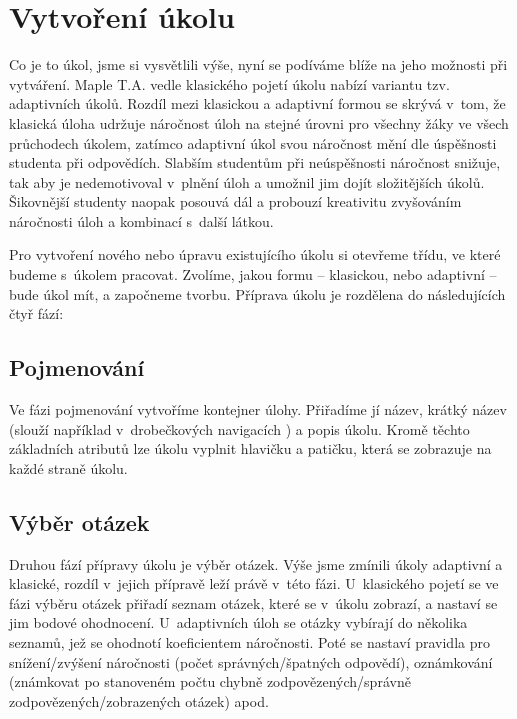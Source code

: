 \documentclass[
print,
  11pt,
  table,   
  nolof,    
  nolot,
  oneside,final
]{fithesis3}
\begin{document}
	\section{Vytvoření úkolu} \label{sec:vytvoreniukol}

Co je to úkol, jsme si vysvětlili výše, nyní se podíváme blíže na jeho možnosti při vytváření. Maple T.A. vedle klasického pojetí úkolu nabízí variantu tzv. adaptivních úkolů. Rozdíl mezi klasickou a adaptivní formou se skrývá v~tom, že klasická úloha udržuje náročnost úloh na stejné úrovni pro všechny žáky ve všech průchodech úkolem, zatímco adaptivní úkol svou náročnost mění dle úspěšnosti studenta při odpovědích. Slabším studentům při neúspěšnosti náročnost snižuje, tak aby je nedemotivoval v~plnění úloh a umožnil jim dojít složitějších úkolů. Šikovnější studenty naopak posouvá dál a probouzí kreativitu zvyšováním náročnosti úloh a kombinací s~další látkou. 

Pro vytvoření nového nebo úpravu existujícího úkolu si otevřeme třídu, ve které budeme s~úkolem pracovat. Zvolíme, jakou formu – klasickou, nebo adaptivní – bude úkol mít, a započneme tvorbu. Příprava úkolu je rozdělena do následujících čtyř fází:

\subsection*{Pojmenování}
Ve fázi pojmenování vytvoříme kontejner úlohy. Přiřadíme jí název, krátký název (slouží například v~drobečkových navigacích ) a popis úkolu. Kromě těchto základních atributů lze úkolu vyplnit hlavičku a patičku, která se zobrazuje na každé straně úkolu.

\subsection*{Výběr otázek}
Druhou fází přípravy úkolu je výběr otázek. Výše jsme zmínili úkoly adaptivní a klasické, rozdíl v~jejich přípravě leží právě v~této fázi. U~klasického pojetí se ve fázi výběru otázek přiřadí seznam otázek, které se v~úkolu zobrazí, a nastaví se jim bodové ohodnocení. U~adaptivních úloh se otázky vybírají do několika seznamů, jež se ohodnotí koeficientem náročnosti. Poté se nastaví pravidla pro snížení/zvýšení náročnosti (počet správných/špatných odpovědí), oznámkování (známkovat po stanoveném počtu chybně zodpovězených/správně zodpovězených/zobrazených otázek) apod.
\end{document}
